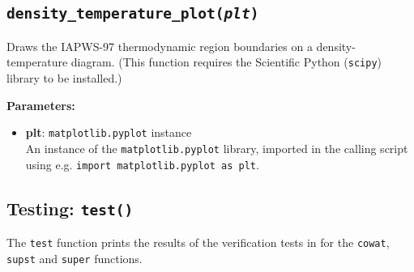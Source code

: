 \begin{snugshade}
\subsection{\texttt{density\_temperature\_plot(\emph{plt})}}
\end{snugshade}
\label{sec:iapws97:density_temperature_plot}

Draws the IAPWS-97 thermodynamic region boundaries on a density-temperature diagram.  (This function requires the Scientific Python (\texttt{scipy}) library to be installed.)

\textbf{Parameters:}
\begin{itemize}
\item \textbf{plt}: \texttt{matplotlib.pyplot} instance\\
  An instance of the \texttt{matplotlib.pyplot} library, imported in the calling script using e.g. \texttt{import matplotlib.pyplot as plt}.
\end{itemize}

\begin{snugshade}
\section{Testing: \texttt{test()}}
\end{snugshade}
\label{sec:iapws97:test}

The \texttt{test} function prints the results of the verification tests in \cite{iapws_2000} for the \texttt{cowat}, \texttt{supst} and \texttt{super} functions.
